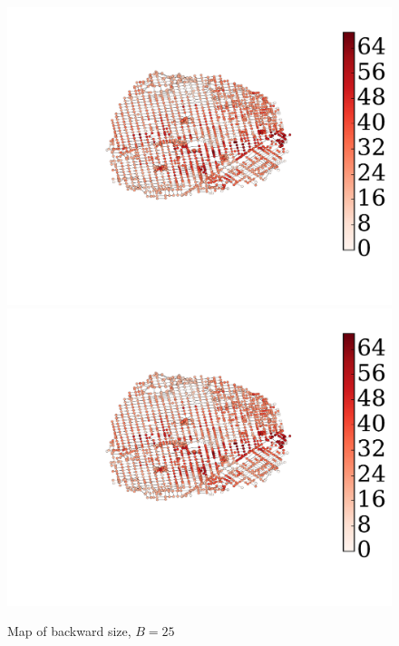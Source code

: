 \begin{figure}
\begin{center}
\includegraphics[clip, trim=4.5cm 4.8cm 4.7cm 3cm,scale=0.8]{TexImg/SF_hub_sizes.pdf}
\includegraphics[clip, trim=15.8cm 0cm 0.4cm 1cm,scale=0.3]{TexImg/SF_hub_sizes.pdf}
\end{center}
\caption{Map of backward size, $B=25$}\label{fig:SF_hub_size_map}
\end{figure}

